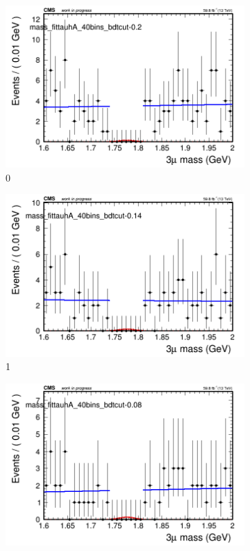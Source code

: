 \begin{figure}[h!]
    \centering
    \begin{subfigure}{0.2\textwidth}
        \includegraphics[width=\textwidth]{unfixed_exp/plots/tauhA/massfit_tauhA_40bins_bdtcut-0.2.png}
        \caption{0}
    \end{subfigure}
    \begin{subfigure}{0.2\textwidth}
        \includegraphics[width=\textwidth]{unfixed_exp/plots/tauhA/massfit_tauhA_40bins_bdtcut-0.14.png}
        \caption{1}
    \end{subfigure}
    \begin{subfigure}{0.2\textwidth}
        \includegraphics[width=\textwidth]{unfixed_exp/plots/tauhA/massfit_tauhA_40bins_bdtcut-0.08.png}

\end{subfigure}
\end{figure}

